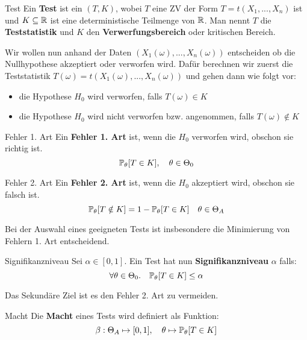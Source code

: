 
\begin{mainbox}{Test}
    Ein \textbf{Test} ist ein $(T, K)$, wobei $T$ eine ZV der Form $T = t(X_1,...,X_n)$ ist und $K \subseteq \mathbb{R}$ ist eine deterministische Teilmenge von $\mathbb{R}$. Man nennt $T$ die \textbf{Teststatistik} und $K$ den \textbf{Verwerfungsbereich} oder kritischen Bereich.
\end{mainbox}

Wir wollen nun anhand der Daten $(X_1(\omega), ..., X_n(\omega))$ entscheiden ob die Nullhypothese akzeptiert oder verworfen wird. Dafür berechnen wir zuerst die Teststatistik $T(\omega) = t(X_1(\omega), ..., X_n(\omega))$ und gehen dann wie folgt vor:
\begin{itemize}
    \item die Hypothese $H_0$ wird verworfen, falls $T(\omega) \in K$
    \item die Hypothese $H_0$ wird nicht verworfen bzw. angenommen, falls $T(\omega) \notin K$
\end{itemize}

\begin{subbox}{Fehler 1. Art}
    Ein \textbf{Fehler 1. Art} ist, wenn die $H_0$ verworfen wird, obschon sie richtig ist.
    $$\mathbb{P}_\theta[T \in K], \quad \theta \in \Theta_0$$
\end{subbox}


\begin{subbox}{Fehler 2. Art}
    Ein \textbf{Fehler 2. Art} ist, wenn die $H_0$ akzeptiert wird, obschon sie falsch ist.
    $$\mathbb{P}_\theta[T \notin K] = 1 - \mathbb{P}_\theta [T \in K] \quad \theta \in \Theta_A$$

\end{subbox}



Bei der Auswahl eines geeigneten Tests ist insbesondere die Minimierung von Fehlern 1. Art entscheidend. \smallskip

\begin{mainbox}{Signifikanzniveau}
    Sei $\alpha \in [0,1]$. Ein Test hat nun \textbf{Signifikanzniveau} $\alpha$ falls:
    $$\forall \theta \in \Theta_0. \quad \mathbb{P}_\theta[T \in K] \leq \alpha$$
\end{mainbox}

Das Sekundäre Ziel ist es den Fehler 2. Art zu vermeiden. \smallskip

\begin{mainbox}{Macht}
    Die \textbf{Macht} eines Tests wird definiert als Funktion:
    $$\beta: \Theta_A \mapsto [0,1], \quad \theta \mapsto \mathbb{P}_\theta[T \in K]$$
\end{mainbox}

